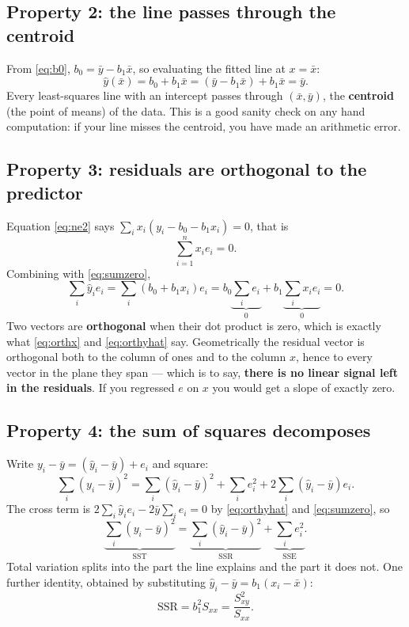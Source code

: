 \documentclass[11pt]{article}
\begin{document}
\subsection{Property 2: the line passes through the centroid}

From \eqref{eq:b0}, $b_0 = \bar y - b_1\bar x$, so evaluating the fitted line
at $x=\bar x$:
\begin{equation}
  \hat y(\bar x) = b_0 + b_1\bar x = (\bar y - b_1\bar x) + b_1\bar x
    = \bar y .
  \label{eq:centroid}
\end{equation}
Every least-squares line with an intercept passes through
$(\bar x, \bar y)$, the \textbf{centroid} (the point of means) of the data. This is a good sanity check on any hand computation: if
your line misses the centroid, you have made an arithmetic error.

\subsection{Property 3: residuals are orthogonal to the predictor}

Equation \eqref{eq:ne2} says $\sum_i x_i(y_i - b_0 - b_1x_i) = 0$, that is
\begin{equation}
  \sum_{i=1}^{n} x_ie_i = 0 .
  \label{eq:orthx}
\end{equation}
Combining with \eqref{eq:sumzero},
\begin{equation}
  \sum_i \hat y_ie_i = \sum_i (b_0 + b_1x_i)e_i
    = b_0\underbrace{\sum_i e_i}_{0} + b_1\underbrace{\sum_i x_ie_i}_{0}
    = 0 .
  \label{eq:orthyhat}
\end{equation}
Two vectors are \textbf{orthogonal} when their dot product is zero, which is
exactly what \eqref{eq:orthx} and \eqref{eq:orthyhat} say. Geometrically the
residual vector is orthogonal both to the column of ones and
to the column $x$, hence to every vector in the plane they span --- which is
to say, \textbf{there is no linear signal left in the residuals}. If you
regressed $e$ on $x$ you would get a slope of exactly zero.

\subsection{Property 4: the sum of squares decomposes}

Write $y_i - \bar y = (\hat y_i - \bar y) + e_i$ and square:
\[
  \sum_i (y_i-\bar y)^2 = \sum_i(\hat y_i - \bar y)^2 + \sum_i e_i^2
    + 2\sum_i (\hat y_i - \bar y)e_i .
\]
The cross term is $2\sum_i \hat y_ie_i - 2\bar y\sum_i e_i = 0$ by
\eqref{eq:orthyhat} and \eqref{eq:sumzero}, so
\begin{equation}
  \underbrace{\sum_i (y_i - \bar y)^2}_{\mathrm{SST}}
    = \underbrace{\sum_i (\hat y_i - \bar y)^2}_{\mathrm{SSR}}
    + \underbrace{\sum_i e_i^2}_{\mathrm{SSE}} .
  \label{eq:anova}
\end{equation}
Total variation splits into the part the line explains and the part it does
not. One further identity, obtained by substituting
$\hat y_i - \bar y = b_1(x_i - \bar x)$:
\begin{equation}
  \mathrm{SSR} = b_1^2 S_{xx} = \frac{S_{xy}^2}{S_{xx}} .
  \label{eq:ssr}
\end{equation}
\end{document}
